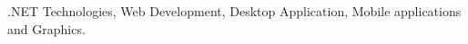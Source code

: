 
\begin{cvparagraph}

.NET Technologies, Web Development, Desktop Application,
  Mobile applications and Graphics.
 

\end{cvparagraph}
